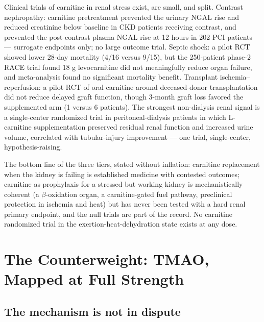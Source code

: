Clinical trials of carnitine in renal stress exist, are small, and split. Contrast nephropathy: carnitine pretreatment prevented the urinary NGAL rise and reduced creatinine below baseline in CKD patients receiving contrast, and prevented the post-contrast plasma NGAL rise at 12 hours in 202 PCI patients --- surrogate endpoints only; no large outcome trial. Septic shock: a pilot RCT showed lower 28-day mortality (4/16 versus 9/15), but the 250-patient phase-2 RACE trial found 18 g levocarnitine did not meaningfully reduce organ failure, and meta-analysis found no significant mortality benefit. Transplant ischemia--reperfusion: a pilot RCT of oral carnitine around deceased-donor transplantation did not reduce delayed graft function, though 3-month graft loss favored the supplemented arm (1 versus 6 patients). The strongest non-dialysis renal signal is a single-center randomized trial in peritoneal-dialysis patients in which L-carnitine supplementation preserved residual renal function and increased urine volume, correlated with tubular-injury improvement --- one trial, single-center, hypothesis-raising.

The bottom line of the three tiers, stated without inflation: carnitine replacement when the kidney is failing is established medicine with contested outcomes; carnitine as prophylaxis for a stressed but working kidney is mechanistically coherent (a $\beta$-oxidation organ, a carnitine-gated fuel pathway, preclinical protection in ischemia and heat) but has never been tested with a hard renal primary endpoint, and the null trials are part of the record. No carnitine randomized trial in the exertion-heat-dehydration state exists at any dose.

\section{The Counterweight: TMAO, Mapped at Full Strength}
\label{sec:tmao}

\subsection{The mechanism is not in dispute}

